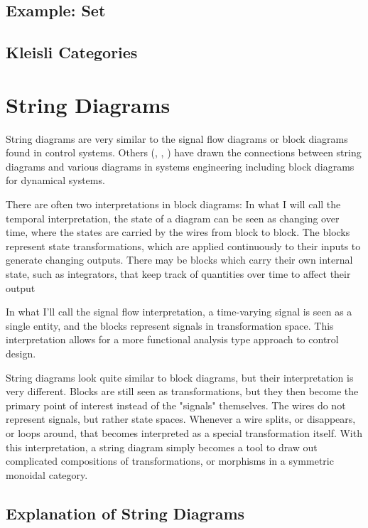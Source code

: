 \subsection{Example: Set}
\subsection{Kleisli Categories}

\section{String Diagrams}

String diagrams are very similar to the signal flow diagrams or block diagrams found in control systems.
Others (\cite{baez2015control}, \cite{fong2016thesis}, \cite{fong2016dynamicalsystems}) have drawn the connections between string diagrams and various diagrams in systems engineering including block diagrams for dynamical systems.

There are often two interpretations in block diagrams:
In what I will call the temporal interpretation, the state of a diagram can be seen as changing over time, where the states are carried by the wires from block to block. The blocks represent state transformations, which are applied continuously to their inputs to generate changing outputs.
There may be blocks which carry their own internal state, such as integrators, that keep track of quantities over time to affect their output

In what I'll call the signal flow interpretation, a time-varying signal is seen as a single entity, and the blocks represent signals in transformation space. This interpretation allows for a more functional analysis type approach to control design.

String diagrams look quite similar to block diagrams, but their interpretation is very different.
Blocks are still seen as transformations, but they then become the primary point of interest instead of the "signals" themselves.
The wires do not represent signals, but rather state spaces.
Whenever a wire splits, or disappears, or loops around, that becomes interpreted as a special transformation itself.
With this interpretation, a string diagram simply becomes a tool to draw out complicated compositions of transformations, or morphisms in a symmetric monoidal category.

\subsection{Explanation of String Diagrams}

